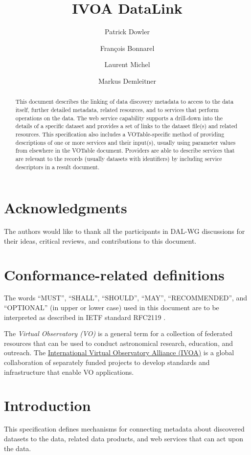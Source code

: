 \documentclass[11pt,a4paper]{ivoa}
\title{IVOA DataLink}
\author[http://www.ivoa.net/twiki/bin/view/IVOA/PatrickDowler]
       {Patrick Dowler}
\author[http://www.ivoa.net/twiki/bin/view/IVOA/FrancoisBonnarel]
       {Fran\c{c}ois Bonnarel}
\author[http://www.ivoa.net/twiki/bin/view/IVOA/LaurentMichel]
       {Laurent Michel}
\author[http://www.ivoa.net/twiki/bin/view/IVOA/MarkusDemleitner]
       {Markus Demleitner}
\begin{document}
\begin{abstract}
This document describes the linking of data discovery metadata
to access to the data itself, further detailed metadata, related
resources, and to services that perform operations on the data. The web
service capability supports a drill-down into the details of a specific
dataset and provides a set of links to the dataset file(s) and related
resources. This specification also includes a VOTable-specific method
of providing descriptions of one or more services and their input(s),
usually using parameter values from elsewhere in the VOTable document.
Providers are able to describe services that are relevant to the records
(usually datasets with identifiers) by including service descriptors in
a result document.
\end{abstract}


\section*{Acknowledgments}

The authors would like to thank all the participants in DAL-WG discussions
for their ideas, critical reviews, and contributions to this document.


\section*{Conformance-related definitions}

The words ``MUST'', ``SHALL'', ``SHOULD'', ``MAY'', ``RECOMMENDED'', and
``OPTIONAL'' (in upper or lower case) used in this document are to be
interpreted as described in IETF standard RFC2119 \citep{std:RFC2119}.

The \emph{Virtual Observatory (VO)} is a
general term for a collection of federated resources that can be used
to conduct astronomical research, education, and outreach.
The \href{http://www.ivoa.net}{International
Virtual Observatory Alliance (IVOA)} is a global
collaboration of separately funded projects to develop standards and
infrastructure that enable VO applications.


\section{Introduction}

This specification defines mechanisms for connecting metadata about
discovered datasets to the data, related data products, and web services
that can act upon the data.
\end{document}
